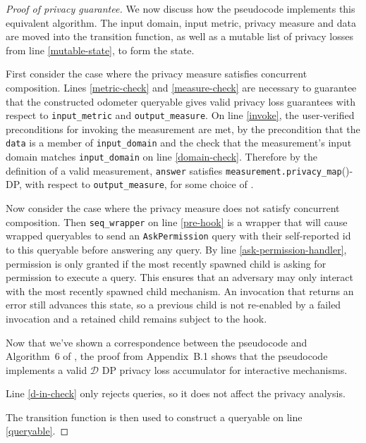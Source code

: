 \documentclass{article}
\begin{document}
\begin{proof}[Proof of privacy guarantee]
    We now discuss how the pseudocode implements this equivalent algorithm.
    The input domain, input metric, privacy measure and data are moved into the transition function,
    as well as a mutable list of privacy losses from line \ref{mutable-state},
    to form the state.

    First consider the case where the privacy measure satisfies concurrent composition.
    Lines \ref{metric-check} and \ref{measure-check} are necessary to guarantee that the constructed odometer queryable
    gives valid privacy loss guarantees with respect to \texttt{input\_metric} and \texttt{output\_measure}.
    On line \ref{invoke}, the user-verified preconditions for invoking the measurement are met,
    by the precondition that the \texttt{data} is a member of \texttt{input\_domain}
    and the check that the measurement's input domain matches \texttt{input\_domain} on line \ref{domain-check}.
    Therefore by the definition of a valid measurement,
    \texttt{answer} satisfies \texttt{measurement.privacy\_map}(\din)-DP, with respect to \texttt{output\_measure},
    for some choice of \din.

    Now consider the case where the privacy measure does not satisfy concurrent composition.
    Then \texttt{seq\_wrapper} on line \ref{pre-hook} is a wrapper that will cause wrapped queryables
    to send an \texttt{AskPermission} query with their self-reported id to this queryable before answering any query.
    By line \ref{ask-permission-handler}, permission is only granted
    if the most recently spawned child is asking for permission to execute a query.
    This ensures that an adversary may only interact with the most recently spawned child mechanism.
    An invocation that returns an error still advances this state, so a previous child
    is not re-enabled by a failed invocation and a retained child remains subject to the hook.


    Now that we've shown a correspondence between the pseudocode and Algorithm~6 of \cite{haney2023concurrentcompositioninteractivedifferential},
    the proof from Appendix~B.1 shows that the pseudocode implements a valid $\mathcal{D}$ DP privacy loss accumulator for interactive mechanisms.

    Line \ref{d-in-check} only rejects queries, so it does not affect the privacy analysis.

    The transition function is then used to construct a queryable on line \ref{queryable}.
\end{proof}



\end{document}
